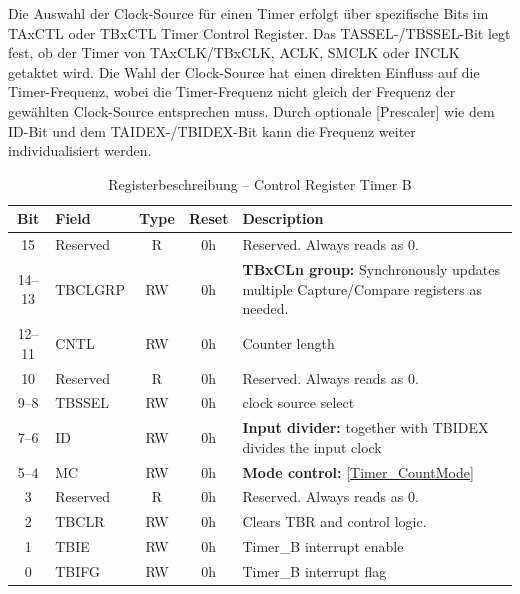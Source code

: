 Die Auswahl der Clock-Source f\"ur einen Timer erfolgt \"uber spezifische Bits im TAxCTL oder TBxCTL Timer Control Register. Das TASSEL-/TBSSEL-Bit legt fest, ob der Timer von TAxCLK/TBxCLK, ACLK, SMCLK oder INCLK getaktet wird. Die Wahl der Clock-Source hat einen direkten Einfluss auf die Timer-Frequenz, wobei die Timer-Frequenz nicht gleich der Frequenz der gew\"ahlten Clock-Source entsprechen muss. Durch optionale [Prescaler] wie dem ID-Bit und dem TAIDEX-/TBIDEX-Bit kann die Frequenz weiter individualisiert werden. 

\begin{table}[h!]
	\small
	\centering
	\begin{tabular}{|c|l|c|c|p{8cm}|}
		\hline
		\textbf{Bit} & \textbf{Field} & \textbf{Type} & \textbf{Reset} & \textbf{Description} \\ \hline
		15 & Reserved & R & 0h & Reserved. Always reads as 0. \\ \hline
		14–13 & TBCLGRP & RW & 0h & \textbf{TBxCLn group:} Synchronously updates multiple Capture/Compare registers as needed. \\ \hline
		12–11 & CNTL & RW & 0h & Counter length \\ \hline
		10 & Reserved & R & 0h & Reserved. Always reads as 0. \\ \hline
		9–8 & TBSSEL & RW & 0h & clock source select \\ \hline
		7–6 & ID & RW & 0h & \textbf{Input divider:} together with TBIDEX divides the input clock \\ \hline
		5–4 & MC & RW & 0h & \textbf{Mode control:} \ref{Timer_CountMode} \\ \hline
		3 & Reserved & R & 0h & Reserved. Always reads as 0. \\ \hline
		2 & TBCLR & RW & 0h & Clears TBR and control logic. \\ \hline
		1 & TBIE & RW & 0h & Timer\_B interrupt enable \\ \hline
		0 & TBIFG & RW & 0h & Timer\_B interrupt flag \\ \hline
	\end{tabular}
	\caption{Registerbeschreibung – Control Register Timer B\\}
	\label{tab:tb_c_register}
\end{table}

